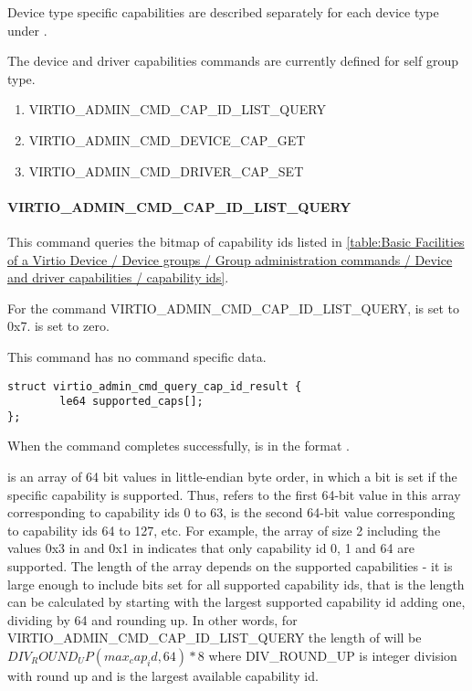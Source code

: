Device type specific capabilities are described separately for each device
type under .

The device and driver capabilities commands are currently defined for self group
type.

\begin{enumerate}
\item VIRTIO_ADMIN_CMD_CAP_ID_LIST_QUERY
\item VIRTIO_ADMIN_CMD_DEVICE_CAP_GET
\item VIRTIO_ADMIN_CMD_DRIVER_CAP_SET
\end{enumerate}

\paragraph{VIRTIO_ADMIN_CMD_CAP_ID_LIST_QUERY}\label{par:Basic Facilities of a Virtio Device / Device groups / Group administration commands / Device and driver capabilities / VIRTIO_ADMIN_CMD_CAP_ID_LIST_QUERY}

This command queries the bitmap of capability ids
listed in \ref{table:Basic Facilities of a Virtio Device / Device groups / Group administration commands / Device and driver capabilities / capability ids}.

For the command VIRTIO_ADMIN_CMD_CAP_ID_LIST_QUERY,  is set to 0x7.
 is set to zero.

This command has no command specific data.

\begin{lstlisting}
struct virtio_admin_cmd_query_cap_id_result {
        le64 supported_caps[];
};
\end{lstlisting}

When the command completes successfully, 
is in the format .

 is an array of 64 bit values in little-endian byte
order, in which a bit is set if the specific capability is supported.
Thus,  refers to the first 64-bit value in this
array corresponding to capability ids 0 to
63,  is the second 64-bit value corresponding to
capability ids 64 to 127, etc. For example, the array of size 2 including
the values 0x3 in  and 0x1 in
 indicates that only capability id 0, 1
and 64 are supported.
The length of the array depends on the supported capabilities - it is
large enough to include bits set for all supported capability ids,
that is the length can be calculated by starting with the largest
supported capability id adding one, dividing by 64 and rounding up.
In other words, for VIRTIO_ADMIN_CMD_CAP_ID_LIST_QUERY the length of
 will be
$DIV_ROUND_UP(max_cap_id, 64) * 8$ where DIV_ROUND_UP is integer division
with round up and  is the largest available capability id.

